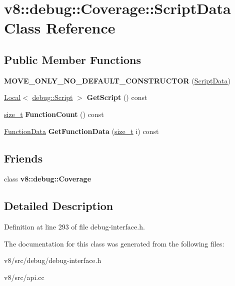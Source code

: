 \hypertarget{classv8_1_1debug_1_1Coverage_1_1ScriptData}{}\section{v8\+:\+:debug\+:\+:Coverage\+:\+:Script\+Data Class Reference}
\label{classv8_1_1debug_1_1Coverage_1_1ScriptData}
\subsection*{Public Member Functions}
\begin{DoxyCompactItemize}
\item 
\mbox{\label{classv8_1_1debug_1_1Coverage_1_1ScriptData_a9f579424ede1cb055d8a00cc67e3993d}} 
{\bfseries M\+O\+V\+E\+\_\+\+O\+N\+L\+Y\+\_\+\+N\+O\+\_\+\+D\+E\+F\+A\+U\+L\+T\+\_\+\+C\+O\+N\+S\+T\+R\+U\+C\+T\+OR} (\mbox{\hyperlink{classv8_1_1debug_1_1Coverage_1_1ScriptData}{Script\+Data}})
\item 
\mbox{\label{classv8_1_1debug_1_1Coverage_1_1ScriptData_acbe5a620e70020ebb18aae279713c4be}} 
\mbox{\hyperlink{classv8_1_1Local}{Local}}$<$ \mbox{\hyperlink{classv8_1_1debug_1_1Script}{debug\+::\+Script}} $>$ {\bfseries Get\+Script} () const
\item 
\mbox{\label{classv8_1_1debug_1_1Coverage_1_1ScriptData_a27455cd991eddab1b21dde85584dff9a}} 
\mbox{\hyperlink{classsize__t}{size\+\_\+t}} {\bfseries Function\+Count} () const
\item 
\mbox{\label{classv8_1_1debug_1_1Coverage_1_1ScriptData_a2cbdf2337606a2d00a66a27680606ff3}} 
\mbox{\hyperlink{classv8_1_1debug_1_1Coverage_1_1FunctionData}{Function\+Data}} {\bfseries Get\+Function\+Data} (\mbox{\hyperlink{classsize__t}{size\+\_\+t}} i) const
\end{DoxyCompactItemize}
\subsection*{Friends}
\begin{DoxyCompactItemize}
\item 
\mbox{\label{classv8_1_1debug_1_1Coverage_1_1ScriptData_aa0107e544c6c97430c40c025b25ec5cf}} 
class {\bfseries v8\+::debug\+::\+Coverage}
\end{DoxyCompactItemize}


\subsection{Detailed Description}


Definition at line 293 of file debug-\/interface.\+h.



The documentation for this class was generated from the following files\+:\begin{DoxyCompactItemize}
\item 
v8/src/debug/debug-\/interface.\+h\item 
v8/src/api.\+cc\end{DoxyCompactItemize}
